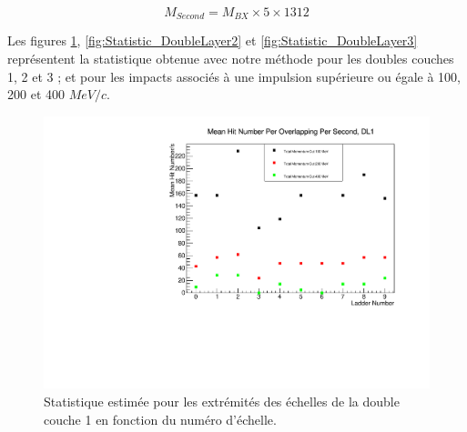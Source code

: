   \begin{equation}
   M_{Second} =  M_{BX} \times 5 \times 1312
  \end{equation}

  Les figures \ref{fig:Statistic_DoubleLayer1}, \ref{fig:Statistic_DoubleLayer2} et \ref{fig:Statistic_DoubleLayer3} repr\'esentent la statistique obtenue avec notre méthode pour les doubles couches 1, 2 et 3 ; et pour les impacts associ\'es \`a une impulsion sup\'erieure ou \'egale \`a 100, 200 et 400 $MeV/c$.
  
   \begin{figure}[!htb]
    \begin{center}
      \includegraphics[scale=0.60]{./figures/MVs_Beamstrahlung/miniVectorsStudy/meanHitNumber_PerOr_PerSecond_DL1.pdf}
      \caption{Statistique estim\'ee pour les extr\'emit\'es des \'echelles de la double couche 1 en fonction du num\'ero d'\'echelle.}
      \label{fig:Statistic_DoubleLayer1}
    \end{center}
  \end{figure}
  
